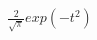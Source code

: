 \documentclass[preview]{standalone}
\begin{document}
\begin{align*}
{ \frac{2}{\sqrt{\pi}} } exp( -t^2 )
\end{align*}
\end{document}
